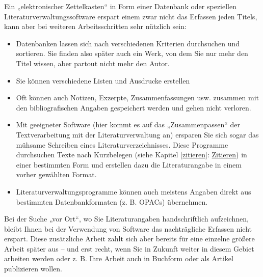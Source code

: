 \documentclass[]{book}
\providecommand{\tightlist}{%
  \setlength{\itemsep}{0pt}\setlength{\parskip}{0pt}}
\theoremstyle{definition}
\theoremstyle{definition}
\theoremstyle{definition}
\theoremstyle{remark}
\begin{document}
Ein „elektronischer Zettelkasten`` in Form einer Datenbank oder
speziellen Literaturverwaltungssoftware erspart einem zwar nicht das
Erfassen jeden Titels, kann aber bei weiteren Arbeitsschritten sehr
nützlich sein:

\begin{itemize}
\tightlist
\item
  Datenbanken lassen sich nach verschiedenen Kriterien durchsuchen und
  sortieren. Sie finden also später auch ein Werk, von dem Sie nur mehr
  den Titel wissen, aber partout nicht mehr den Autor.
\item
  Sie können verschiedene Listen und Ausdrucke erstellen
\item
  Oft können auch Notizen, Exzerpte, Zusammenfassungen usw. zusammen mit
  den bibliografischen Angaben gespeichert werden und gehen nicht
  verloren.
\item
  Mit geeigneter Software (hier kommt es auf das „Zusammenpassen`` der
  Textverarbeitung mit der Literaturverwaltung an) ersparen Sie sich
  sogar das mühsame Schreiben eines Literaturverzeichnisses. Diese
  Programme durchsuchen Texte nach Kurzbelegen (siehe Kapitel
  \ref{zitieren}: \protect\hyperlink{zitieren}{Zitieren}) in einer
  bestimmten Form und erstellen dazu die Literaturangabe in einem vorher
  gewählten Format.
\item
  Literaturverwaltungsprogramme können auch meistens Angaben direkt aus
  bestimmten Datenbankformaten (z. B. OPACs) übernehmen.
\end{itemize}

Bei der Suche „vor Ort``, wo Sie Literaturangaben handschriftlich
aufzeichnen, bleibt Ihnen bei der Verwendung von Software das
nachträgliche Erfassen nicht erspart. Diese zusätzliche Arbeit zahlt
sich aber bereits für eine einzelne größere Arbeit später aus -- und
erst recht, wenn Sie in Zukunft weiter in diesem Gebiet arbeiten werden
oder z. B. Ihre Arbeit auch in Buchform oder als Artikel publizieren
wollen.
\end{document}
